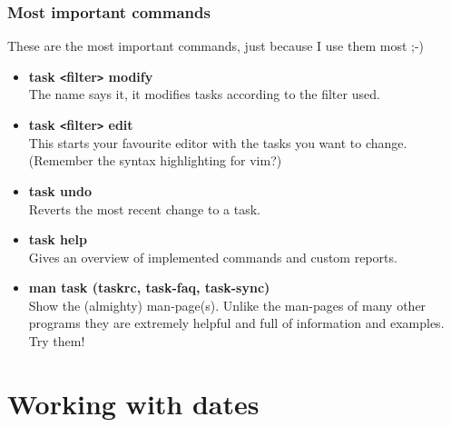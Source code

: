 \documentclass[t]{beamer}
\begin{document}
\begin{frame}[fragile]\frametitle{Most important commands}
    These are the most important commands, just because I use them most ;-)

    \begin{itemize}
        \item \textbf{task {\tt<}filter{\tt>} modify} \\
        The name says it, it modifies tasks according to the filter used. \pause
        \item \textbf{task {\tt<}filter{\tt>} edit} \\
        This starts your favourite editor with the tasks you want to change. \\
        (Remember the syntax highlighting for vim?) \pause
        \item \textbf{task undo} \\
        Reverts the most recent change to a task. \pause
        \item \textbf{task help} \\
        Gives an overview of implemented commands and custom reports. \pause
        \item \textbf{man task (taskrc, task-faq, task-sync)} \\
        Show the (almighty) man-page(s). Unlike the man-pages of many other
        programs they are extremely helpful and full of information and examples.
        Try them!
    \end{itemize}
\end{frame}

\section{Working with dates}
\end{document}
